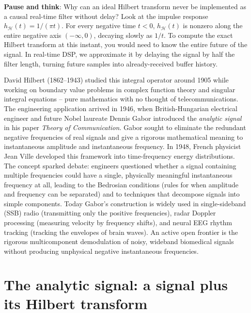 \begin{recoverybox}
\textbf{Pause and think}: Why can an ideal Hilbert transform never be implemented as a causal real-time filter without delay? Look at the impulse response $h_{\mathcal H}(t) = 1/(\pi t)$. For every negative time $t < 0$, $h_{\mathcal H}(t)$ is nonzero along the entire negative axis $(-\infty, 0)$, decaying slowly as $1/t$. To compute the exact Hilbert transform at this instant, you would need to know the entire future of the signal. In real-time DSP, we approximate it by delaying the signal by half the filter length, turning future samples into already-received buffer history.
\end{recoverybox}

\begin{historybox}
David Hilbert (1862--1943) studied this integral operator around 1905 while working on
boundary value problems in complex function theory and singular integral equations --
pure mathematics with no thought of telecommunications. The engineering application
arrived in 1946, when British-Hungarian electrical engineer and future Nobel laureate Dennis
Gabor introduced the \emph{analytic signal} in his paper \emph{Theory of
Communication}. Gabor sought to eliminate the redundant negative frequencies of real
signals and give a rigorous mathematical meaning to instantaneous amplitude and instantaneous frequency. In 1948, French physicist
Jean Ville developed this framework into time-frequency energy distributions. The concept sparked
debate: engineers questioned whether a signal containing multiple frequencies could have
a single, physically meaningful instantaneous frequency at all, leading to the Bedrosian conditions (rules for when amplitude and frequency can be separated) and to techniques that decompose signals into simple components. Today Gabor's construction is widely used in single-sideband (SSB) radio (transmitting only the positive frequencies), radar Doppler processing (measuring velocity by frequency shifts), and neural EEG rhythm tracking (tracking the envelopes of brain waves).
An active open frontier is
the rigorous multicomponent demodulation of noisy, wideband biomedical signals without
producing unphysical negative instantaneous frequencies.
\end{historybox}

\section{The analytic signal: a signal plus its Hilbert transform}
\label{ch25:analytic}

